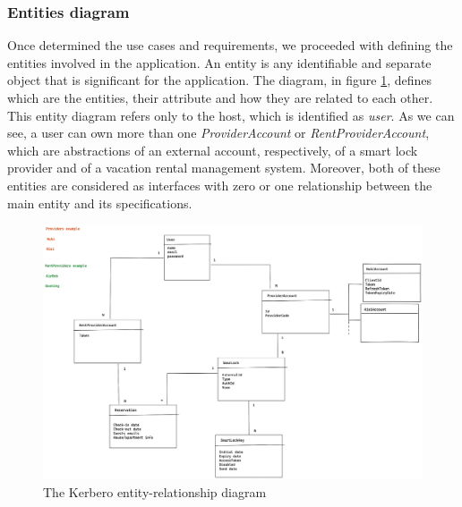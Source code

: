 \subsubsection{Entities diagram}
Once determined the use cases and requirements, we proceeded with defining the entities involved in the application. An entity is any identifiable and separate object that is significant for the application. The diagram, in figure \ref{fig:entitiesdiagram}, defines which are the entities, their attribute and how they are related to each other. 
\\ This entity diagram refers only to the host, which is identified as \textit{user}. As we can see, a user can own more than one \textit{ProviderAccount} or \textit{RentProviderAccount}, which are abstractions of an external account, respectively, of a smart lock provider and of a vacation rental management system. Moreover, both of these entities are considered as interfaces with zero or one relationship between the main entity and its specifications. 
\begin{figure}[H]
    \centering
    \includegraphics[width=\textwidth]{figures/entieties.excalidraw.png}
    \caption{The Kerbero entity-relationship diagram}
    \label{fig:entitiesdiagram}
\end{figure}

